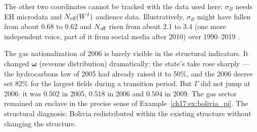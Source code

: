 \documentclass[../structural_economics_book.tex]{subfiles}
\begin{document}
\begin{example}
The other two coordinates cannot be tracked with the data used here: $\sigma_B$ needs EH microdata and $N_{\text{eff}}(W^I)$ audience data. Illustratively, $\sigma_B$ might have fallen from about 0.68 to 0.62 and $N_{\text{eff}}$ risen from about 2.1 to 3.4 (one more independent voice, part of it from social media after 2010) over 1990--2019 \illustrative.

The gas nationalization of 2006 is barely visible in the structural indicators. It changed $\boldsymbol{\omega}$ (revenue distribution) dramatically: the state's take rose sharply --- the hydrocarbons law of 2005 had already raised it to 50\%, and the 2006 decree set 82\% for the largest fields during a transition period. But $\Gamma$ did not jump at 2006: it was $0.502$ in 2005, $0.518$ in 2006 and $0.504$ in 2009. The gas sector remained an enclave in the precise sense of Example~\ref{ch17:ex:bolivia_pi}. The structural diagnosis: Bolivia redistributed within the existing structure without changing the structure.
\end{example}
\end{document}
